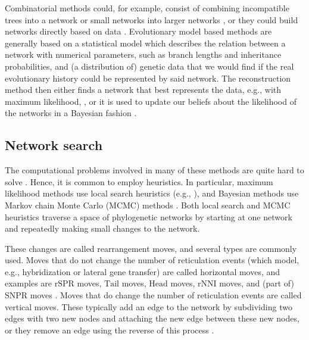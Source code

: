 \documentclass{article}
\theoremstyle{definition}
\newcommand{\Tail}{\mathrm{Tail}}
\newcommand{\Head}{\mathrm{Head}}
\newcommand{\rSPR}{\mathrm{rSPR}}
\newcommand{\rNNI}{\mathrm{rNNI}}
\begin{document}
Combinatorial methods could, for example, consist of combining incompatible trees into a network \cite{yang2013quartet,bordewich2007computing,van2019practical,markin2019robinson} or small networks into larger networks \cite{van2014trinets,oldman2016trilonet,huber2017reconstructing,huber2018quarnet,gross2020distinguishing}, or they could build networks directly based on data \cite{bordewich2016determining,van2020reconstructibility,huber2021reconstructibility}. Evolutionary model based methods are generally based on a statistical model which describes the relation between a network with numerical parameters, such as branch lengths and inheritance probabilities, and (a distribution of) genetic data that we would find if the real evolutionary history could be represented by said network. The reconstruction method then either finds a network that best represents the data, e.g., with maximum likelihood, \cite{jin2006maximum,yu2014maximum,yu2015maximum,solis2016inferring,wu2020inference}, or it is used to update our beliefs about the likelihood of the networks in a Bayesian fashion \cite{vaughan2017inferring,wen2016bayesian,zhang2018bayesian}.

\subsection{Network search}
The computational problems involved in many of these methods are quite hard to solve \cite{foulds1982steiner,chor2006finding,roch2006short,bryant2017quirks}. Hence, it is common to employ heuristics. In particular, maximum likelihood methods use local search heuristics (e.g., \cite{yu2014maximum,wen2016reticulate}), and Bayesian methods use Markov chain Monte Carlo (MCMC) methods \cite{vaughan2017inferring,wen2016bayesian,zhang2018bayesian}. Both local search and MCMC heuristics traverse a space of phylogenetic networks by starting at one network and repeatedly making small changes to the network. 

These changes are called rearrangement moves, and several types are commonly used.
Moves that do not change the number of reticulation events (which model, e.g., hybridization or lateral gene transfer) are called horizontal moves, and examples are $\rSPR$ moves, $\Tail$ moves, $\Head$ moves, $\rNNI$ moves, and (part of) SNPR moves \cite{gambette2017rearrangement,bordewich2017lost,janssen2018exploring}. Moves that do change the number of reticulation events are called vertical moves. 
These typically add an edge to the network by subdividing two edges with two new nodes and attaching the new edge between these new nodes, or they remove an edge using the reverse of this process \cite{gambette2017rearrangement}. 
\end{document}
